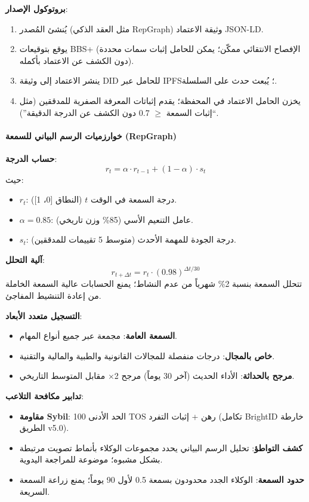 \documentclass[11pt]{article}
\begin{document}
\textbf{بروتوكول الإصدار}:
\begin{enumerate}[noitemsep]
  \item يُنشئ المُصدر (مثل العقد الذكي RepGraph) وثيقة الاعتماد JSON-LD.
  \item يوقع بتوقيعات BBS+ (الإفصاح الانتقائي ممكّن؛ يمكن للحامل إثبات سمات محددة دون الكشف عن الاعتماد بأكمله).
  \item ينشر الاعتماد إلى وثيقة DID للحامل عبر IPFS؛ يُبعث حدث على السلسلة.
  \item يخزن الحامل الاعتماد في المحفظة؛ يقدم إثباتات المعرفة الصفرية للمدققين (مثل ``إثبات السمعة $\geq$ 0.7 دون الكشف عن الدرجة الدقيقة'').
\end{enumerate}

\paragraph{خوارزميات الرسم البياني للسمعة (RepGraph)}

\textbf{حساب الدرجة}:
\begin{equation}
r_t = \alpha \cdot r_{t-1} + (1 - \alpha) \cdot s_t
\end{equation}
حيث:
\begin{itemize}[noitemsep]
  \item $r_t$: درجة السمعة في الوقت $t$ (النطاق [0، 1]).
  \item $\alpha = 0.85$: عامل التنعيم الأسي (85\% وزن تاريخي).
  \item $s_t$: درجة الجودة للمهمة الأحدث (متوسط 5 تقييمات للمدققين).
\end{itemize}

\textbf{آلية التحلل}:
\begin{equation}
r_{t+\Delta t} = r_t \cdot (0.98)^{\Delta t / 30}
\end{equation}
تتحلل السمعة بنسبة 2\% شهرياً من عدم النشاط؛ يمنع الحسابات عالية السمعة الخاملة من إعادة التنشيط المفاجئ.

\textbf{التسجيل متعدد الأبعاد}:
\begin{itemize}[noitemsep]
  \item \textbf{السمعة العامة}: مجمعة عبر جميع أنواع المهام.
  \item \textbf{خاص بالمجال}: درجات منفصلة للمجالات القانونية والطبية والمالية والتقنية.
  \item \textbf{مرجح بالحداثة}: الأداء الحديث (آخر 30 يوماً) مرجح 2$\times$ مقابل المتوسط التاريخي.
\end{itemize}

\textbf{تدابير مكافحة التلاعب}:
\begin{itemize}[noitemsep]
  \item \textbf{مقاومة Sybil}: الحد الأدنى 100 TOS رهن + إثبات التفرد (تكامل BrightID خارطة الطريق v5.0).
  \item \textbf{كشف التواطؤ}: تحليل الرسم البياني يحدد مجموعات الوكلاء بأنماط تصويت مرتبطة بشكل مشبوه؛ موضوعة للمراجعة اليدوية.
  \item \textbf{حدود السمعة}: الوكلاء الجدد محدودون بسمعة 0.5 لأول 90 يوماً؛ يمنع زراعة السمعة السريعة.
\end{itemize}
\end{document}
